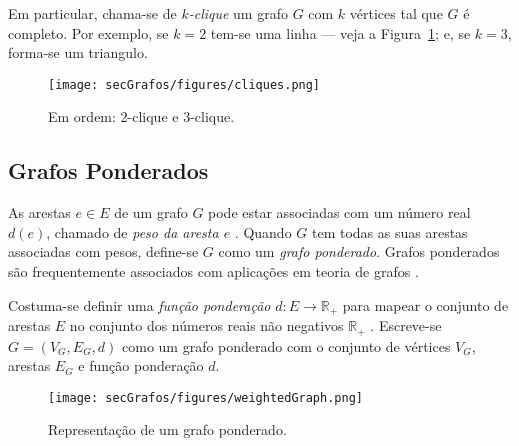 Em particular, chama-se de \textit{$k$-clique} um grafo $G$ com $k$ vértices tal que $G$ é completo. Por exemplo, se $k=2$ tem-se uma linha --- veja a Figura~\ref{fig:cliques}; e, se $k=3$, forma-se um triangulo.

\begin{figure}[H]
	\begin{center}
		\texttt{[image: secGrafos/figures/cliques.png]}
	\end{center}
	\caption{Em ordem: 2-clique e 3-clique.}
	\label{fig:cliques}
\end{figure}

\subsection{Grafos Ponderados}

As arestas $e\in E$ de um grafo $G$ pode estar associadas com um número real $d(e)$, chamado de \textit{peso da aresta $e$} \cite{graphTheoryApplicationsBondy}. Quando $G$ tem todas as suas arestas associadas com pesos, define-se $G$ como um \textit{grafo ponderado}. Grafos ponderados são frequentemente associados com aplicações em teoria de grafos \cite{grafosPremioElon}.

Costuma-se definir uma \textit{função ponderação} $d: E \longrightarrow \mathbb{R}_+$ para mapear o conjunto de arestas $E$ no conjunto dos números reais não negativos $\mathbb{R}_+$ \cite{libertiEDG}. Escreve-se $G = (V_G,E_G,d)$ como um grafo ponderado com o conjunto de vértices $V_G$, arestas $E_G$ e função ponderação $d$.

\begin{figure}[H]
	\begin{center}
		\texttt{[image: secGrafos/figures/weightedGraph.png]}
	\end{center}
	\caption{Representação de um grafo ponderado.}
	\label{fig:weightedGraph}
\end{figure}
